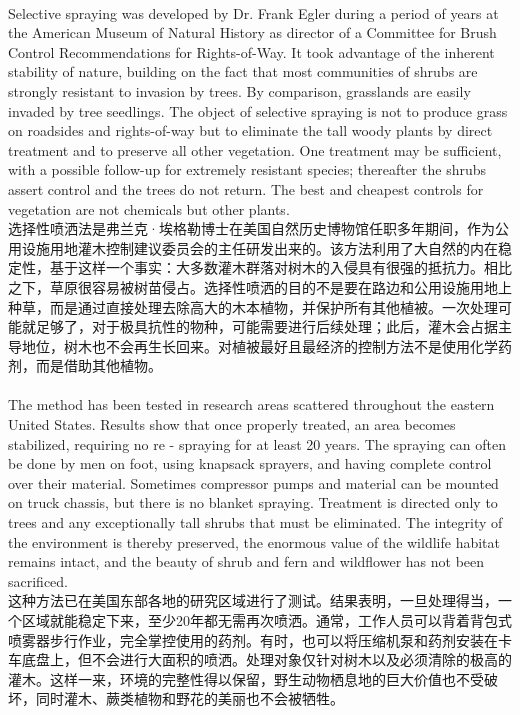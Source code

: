\documentclass{article}
\begin{document}
\\
Selective spraying was developed by Dr. Frank Egler during a period of years at the American Museum of Natural History as director of a Committee for Brush Control Recommendations for Rights-of-Way. It took advantage of the inherent stability of nature, building on the fact that most communities of shrubs are strongly resistant to invasion by trees. By comparison, grasslands are easily invaded by tree seedlings. The object of selective spraying is not to produce grass on roadsides and rights-of-way but to eliminate the tall woody plants by direct treatment and to preserve all other vegetation. One treatment may be sufficient, with a possible follow-up for extremely resistant species; thereafter the shrubs assert control and the trees do not return. The best and cheapest controls for vegetation are not chemicals but other plants.\\
选择性喷洒法是弗兰克·埃格勒博士在美国自然历史博物馆任职多年期间，作为公用设施用地灌木控制建议委员会的主任研发出来的。该方法利用了大自然的内在稳定性，基于这样一个事实：大多数灌木群落对树木的入侵具有很强的抵抗力。相比之下，草原很容易被树苗侵占。选择性喷洒的目的不是要在路边和公用设施用地上种草，而是通过直接处理去除高大的木本植物，并保护所有其他植被。一次处理可能就足够了，对于极具抗性的物种，可能需要进行后续处理；此后，灌木会占据主导地位，树木也不会再生长回来。对植被最好且最经济的控制方法不是使用化学药剂，而是借助其他植物。 \\

\\
The method has been tested in research areas scattered throughout the eastern United States. Results show that once properly treated, an area becomes stabilized, requiring no re - spraying for at least 20 years. The spraying can often be done by men on foot, using knapsack sprayers, and having complete control over their material. Sometimes compressor pumps and material can be mounted on truck chassis, but there is no blanket spraying. Treatment is directed only to trees and any exceptionally tall shrubs that must be eliminated. The integrity of the environment is thereby preserved, the enormous value of the wildlife habitat remains intact, and the beauty of shrub and fern and wildflower has not been sacrificed.\\
这种方法已在美国东部各地的研究区域进行了测试。结果表明，一旦处理得当，一个区域就能稳定下来，至少20年都无需再次喷洒。通常，工作人员可以背着背包式喷雾器步行作业，完全掌控使用的药剂。有时，也可以将压缩机泵和药剂安装在卡车底盘上，但不会进行大面积的喷洒。处理对象仅针对树木以及必须清除的极高的灌木。这样一来，环境的完整性得以保留，野生动物栖息地的巨大价值也不受破坏，同时灌木、蕨类植物和野花的美丽也不会被牺牲。\\  
\end{document}
